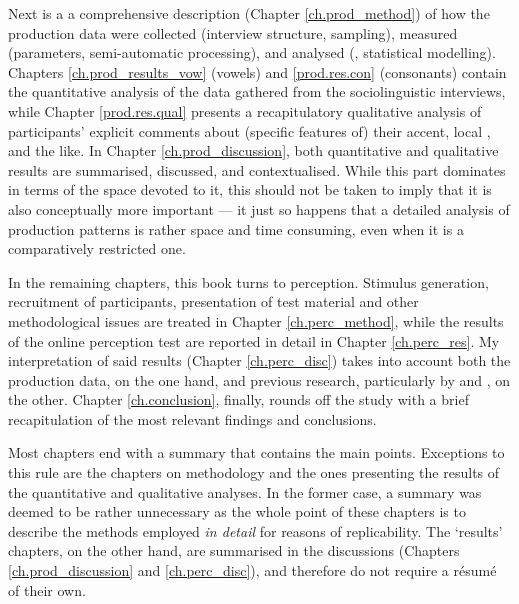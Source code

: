 Next is a a comprehensive description (Chapter \ref{ch.prod_method}) of how the production data were collected (interview structure, sampling), measured (parameters, semi-automatic processing), and analysed (, statistical modelling).
Chapters \ref{ch.prod_results_vow} (vowels) and \ref{prod.res.con} (consonants) contain the quantitative analysis of the data gathered from the sociolinguistic interviews, while Chapter \ref{prod.res.qual} presents a recapitulatory qualitative analysis of participants' explicit comments about (specific features of) their accent, local , and the like.
In Chapter \ref{ch.prod_discussion}, both quantitative and qualitative results are summarised, discussed, and contextualised.
While this part dominates in terms of the space devoted to it, this should not be taken to imply that it is also conceptually more important --- it just so happens that a detailed analysis of production patterns is rather space and time consuming, even when it is a comparatively restricted one.

In the remaining chapters, this book turns to perception.
Stimulus generation, recruitment of participants, presentation of test material and other methodological issues are treated in Chapter \ref{ch.perc_method}, while the results of the online perception test are reported in detail in Chapter \ref{ch.perc_res}.
My interpretation of said results (Chapter \ref{ch.perc_disc}) takes into account both the production data, on the one hand, and previous research, particularly by \textcite{hayetal2006a} and \textcite{haydrager2010}, on the other.
Chapter \ref{ch.conclusion}, finally, rounds off the study with a brief recapitulation of the most relevant findings and conclusions.

Most chapters end with a summary that contains the main points.
Exceptions to this rule are the chapters on methodology and the ones presenting the results of the quantitative and qualitative analyses.
In the former case, a summary was deemed to be rather unnecessary as the whole point of these chapters is to describe the methods employed \emph{in detail} for reasons of replicability.
The `results' chapters, on the other hand, are summarised in the discussions (Chapters \ref{ch.prod_discussion} and \ref{ch.perc_disc}), and therefore do not require a résumé of their own.